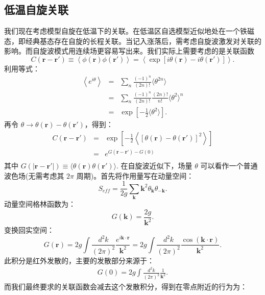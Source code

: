 \documentclass[10pt,UTF8]{ctexart}
\begin{document}
\subsection*{低温自旋关联}
\noindent
我们现在考虑模型自旋在低温下的关联。在低温区自选模型近似地处在一个铁磁态，即经典基态存在自旋的长程关联。当记入涨落后，需考虑自旋波激发对关联的影响。而自旋波模式用连续场更容易写出来。我们实际上需要考虑的是关联函数
\begin{equation}
	C(\bm r - \bm r') \equiv \left\langle \phi(\bm r)\phi(\bm r')\right\rangle
	= \left\langle \exp[i\theta(\bm r)-i\theta(\bm r')] \right\rangle.
\end{equation}
利用等式：
\begin{eqnarray}
	\left\langle e^{i\theta} \right\rangle 
	&=& \sum_n \frac{(-1)^n}{(2n)!} \langle \theta^{2n} \rangle \\
	&=& \sum_n \frac{(-1)^n}{(2n)!} \frac{(2n)!}{n!} \langle \theta^2 \rangle^n \\
	&=& \exp\left[{-\frac{1}{2} \langle \theta^2 \rangle}\right].
\end{eqnarray}
再令 $\theta \rightarrow \theta(\bm r)-\theta(\bm r')$，得到：
\begin{eqnarray}
	C(\bm r-\bm r') &=&  \exp \left[-\frac{1}{2} \left\langle [\theta(\bm r)-\theta(\bm r')]^2\right\rangle \right] \\
	&=& e^{G(\bm r-\bm r')-G(0)} \\
\end{eqnarray}
其中 $G(|\bm r-\bm r'|)\equiv \langle\theta(\bm r)\theta(\bm r')\rangle$. 在自旋波近似下，场量 $\theta$ 可以看作一个普通波色场(无需考虑其 $2\pi$ 周期)。首先将作用量写在动量空间：
\begin{equation}
	S_{eff} = \frac{1}{2g}\sum_{\bm k} \bm k^2 \theta_{\bm k}\theta_{-\bm k}.
\end{equation}
动量空间格林函数为：
\begin{equation}
	G(\bm k) = \frac{2g}{\bm k^2}.
\end{equation}
变换回实空间：
\begin{equation}
	G(\bm r) = 2g\int \frac{d^{2}k}{(2\pi)^{2}} \frac{e^{i\bm k \cdot \bm r}}{\bm k^2}
	=2g\int \frac{d^{2}k}{(2\pi)^{2}} \frac{\cos(\bm k \cdot \bm r)}{\bm k^2}.
\end{equation}
此积分是红外发散的，主要的发散部分来源于：
\begin{eqnarray}
	G(0) = 2g\int \frac{d^{2}k}{(2\pi)^{2}} \frac{1}{\bm k^2}.
\end{eqnarray}
而我们最终要求的关联函数会减去这个发散积分，得到在零点附近的行为为：
\end{document}
